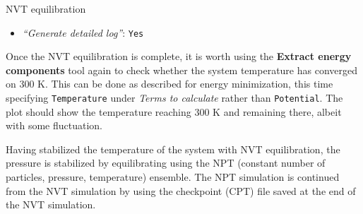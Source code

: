 \documentclass[twocolumn]{bmcart}%
\providecommand{\tightlist}{%
  \setlength{\itemsep}{0pt}\setlength{\parskip}{0pt}}
\begin{document}
\begin{handson_box_colour}{NVT
equilibration}
\begin{itemize}
\begin{itemize}
      \begin{itemize}
      \tightlist
      \item
        \emph{``Bond constraints (constraints)''}:
        \texttt{All\ bonds\ (all-bonds).}
      \item
        \emph{``Temperature /K''}: \texttt{300}
      \item
        \emph{``Step length in ps''}: \texttt{0.002}
      \item
        \emph{``Number of steps that elapse between saving data points
        (velocities, forces, energies)''}: \texttt{1000}
      \item
        \emph{``Number of steps for the simulation''}: \texttt{50000}
      \end{itemize}
    \end{itemize}
  \item
    \emph{``Generate detailed log''}: \texttt{Yes}
  \end{itemize}

\end{handson_box_colour}

Once the NVT equilibration is complete, it is worth using the \textbf{Extract energy components} tool again to check whether the system temperature has converged on 300 K. This can be done as described for energy minimization, this time specifying \texttt{Temperature} under \emph{Terms to calculate} rather than \texttt{Potential}. The plot should show the temperature reaching 300 K and remaining there, albeit with some fluctuation.

Having stabilized the temperature of the system with NVT equilibration, the pressure is stabilized by equilibrating using the NPT (constant number of particles, pressure,
temperature) ensemble. The NPT simulation is continued from the NVT simulation by using the checkpoint (CPT) file saved at the end of the NVT simulation.
\end{document}
